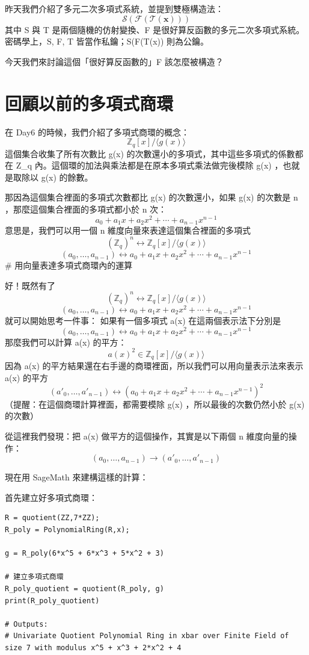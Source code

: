 \documentclass[
]{article}
\author{}
\date{}
\begin{document}
昨天我們介紹了多元二次多項式系統，並提到雙極構造法： \[
\mathcal{S} ( \mathcal{F}(\mathcal{T}(\mathbf{x})) )
\] 其中 S 與 T 是兩個隨機的仿射變換、F
是很好算反函數的多元二次多項式系統。密碼學上，S, F, T
皆當作私鑰；S(F(T(x)) 則為公鑰。

今天我們來討論這個「很好算反函數的」F 該怎麼被構造？

\hypertarget{ux56deux9867ux4ee5ux524dux7684ux591aux9805ux5f0fux5546ux74b0}{%
\section{回顧以前的多項式商環}\label{ux56deux9867ux4ee5ux524dux7684ux591aux9805ux5f0fux5546ux74b0}}

在 Day6 的時候，我們介紹了多項式商環的概念： \[
\mathbb{Z}_{q}[x] / \langle g(x)\rangle
\] 這個集合收集了所有次數比 g(x)
的次數還小的多項式，其中這些多項式的係數都在 Z\_q
內。這個環的加法與乘法都是在原本多項式乘法做完後模除 g(x) ，也就是取除以
g(x) 的餘數。

那因為這個集合裡面的多項式次數都比 g(x) 的次數還小，如果 g(x) 的次數是 n
，那麼這個集合裡面的多項式都小於 n 次： \[
a_{0}+a_{1}x+a_{2}x^2+\cdots + a_{n-1}x^{n-1}
\] 意思是，我們可以用一個 n 維度向量來表達這個集合裡面的多項式 \[
(\mathbb{Z}_{q})^{n} \leftrightarrow \mathbb{Z}_{q}[x] / \langle g(x)\rangle
\] \[
(a_{0},\dots,a_{n-1}) \leftrightarrow
a_{0}+a_{1}x+a_{2}x^2+\cdots + a_{n-1}x^{n-1}
\] \# 用向量表達多項式商環內的運算

好！既然有了 \[
(\mathbb{Z}_{q})^{n} \leftrightarrow \mathbb{Z}_{q}[x] / \langle g(x)\rangle
\] \[
(a_{0},\dots,a_{n-1}) \leftrightarrow
a_{0}+a_{1}x+a_{2}x^2+\cdots + a_{n-1}x^{n-1}
\] 就可以開始思考一件事： 如果有一個多項式 a(x) 在這兩個表示法下分別是
\[
(a_{0},\dots,a_{n-1}) \leftrightarrow
a_{0}+a_{1}x+a_{2}x^2+\cdots + a_{n-1}x^{n-1}
\] 那麼我們可以計算 a(x) 的平方： \[
a(x)^2\in\mathbb{Z}_{q}[x] / \langle g(x)\rangle
\] 因為 a(x)
的平方結果還在右手邊的商環裡面，所以我們可以用向量表示法來表示 a(x)
的平方 \[
(a'_{0},\dots,a'
_{n-1}) \leftrightarrow
(a_{0}+a_{1}x+a_{2}x^2+\cdots + a_{n-1}x^{n-1})^2
\] （提醒：在這個商環計算裡面，都需要模除 g(x) ，所以最後的次數仍然小於
g(x) 的次數）

從這裡我們發現：把 a(x) 做平方的這個操作，其實是以下兩個 n
維度向量的操作： \[
(a_{0},\dots,a
_{n-1})\to (a'_{0},\dots,a'
_{n-1}) 
\]

現在用 SageMath 來建構這樣的計算：

首先建立好多項式商環：

\begin{verbatim}
R = quotient(ZZ,7*ZZ); 
R_poly = PolynomialRing(R,x);

g = R_poly(6*x^5 + 6*x^3 + 5*x^2 + 3)

# 建立多項式商環
R_poly_quotient = quotient(R_poly, g)
print(R_poly_quotient)

# Outputs:
# Univariate Quotient Polynomial Ring in xbar over Finite Field of size 7 with modulus x^5 + x^3 + 2*x^2 + 4
\end{verbatim}
\end{document}
